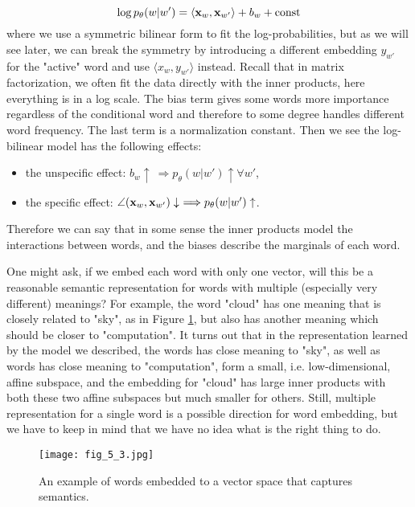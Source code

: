 \documentclass[../main.tex]{subfiles}
\begin{document}
\begin{equation}\label{eq_5_log_bi}
\log p_{\theta}(w|w')=\langle {\bf x}_w,{\bf x}_{w'}\rangle + b_w + {\rm const}
\end{equation}
where we use a symmetric bilinear form to fit the log-probabilities, but as we will see later, we can break the symmetry by introducing a different embedding $y_{w'}$ for the "active" word and use $\langle x_w,y_{w'}\rangle$ instead. Recall that in matrix factorization, we often fit the data directly with the inner products, here everything is in a log scale. The bias term gives some words more importance regardless of the conditional word and therefore to some degree handles different word frequency. The last term is a normalization constant. Then we see the log-bilinear model has the following effects:
\begin{itemize}
	\item the unspecific effect: $b_w \uparrow\ \Longrightarrow p_{\theta}(w|w')\uparrow \forall w'$,
	\item the specific effect: $\angle({\bf x}_w,{\bf x}_{w'})\downarrow\ \Longrightarrow p_{\theta}(w|w')\uparrow$.
\end{itemize}
Therefore we can say that in some sense the inner products model the interactions between words, and the biases describe the marginals of each word.
\begin{remark}
	One might ask, if we embed each word with only one vector, will this be a reasonable semantic representation for words with multiple (especially very different) meanings? For example, the word "cloud" has one meaning that is closely related to "sky", as in Figure \ref{fig_5_3}, but also has another meaning which should be closer to "computation". It turns out that in the representation learned by the model we described, the words has close meaning to "sky", as well as words has close meaning to "computation", form a small, i.e. low-dimensional, affine subspace, and the embedding for "cloud" has large inner products with both these two affine subspaces but much smaller for others. Still, multiple representation for a single word is a possible direction for word embedding, but we have to keep in mind that we have no idea what is the right thing to do.
\end{remark}
\begin{figure}[t] 
	\centering 
	\texttt{[image: fig\_5\_3.jpg]} 
	\caption{An example of words embedded to a vector space that captures semantics.}\label{fig_5_3}
\end{figure}
\end{document}
